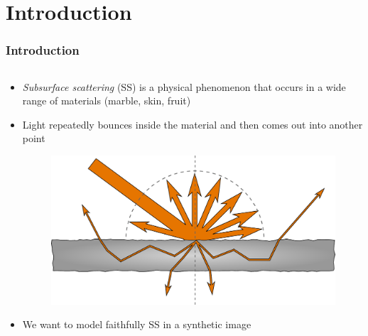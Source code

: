\documentclass{beamer}
\begin{document}
\section{Introduction}
\begin{frame}
    \frametitle{Introduction}
\begin{columns}[t]
    \begin{column}{0.95\textwidth}
      \centering
			\begin{itemize}
				\item \emph{Subsurface scattering} (SS) is a physical phenomenon that occurs in a wide range of materials (marble, skin, fruit) 
				\item Light repeatedly bounces inside the material and then comes out into another point 
		\vspace{-0.3cm}
		\begin{figure}
		\centering
		\includegraphics[width=0.7\paperwidth]{diagram}	
		\end{figure}
		\vspace{-0.4cm}
				\item We want to model faithfully SS in a synthetic image
			\end{itemize}
    \end{column}
  \end{columns}
\end{frame}
\end{document}
